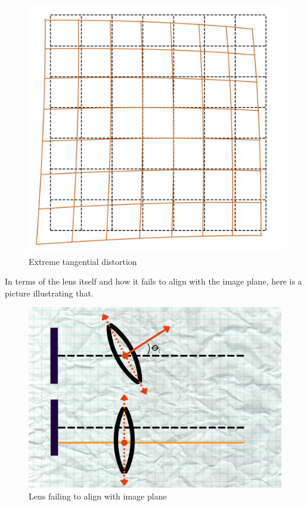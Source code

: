 \documentclass{article}
\begin{document}
\begin{figure}[h]
    \centering
    \includegraphics[scale=0.1]{IMG_1106.jpeg}
    \caption{Extreme tangential distortion}
    \label{fig:enter-label}
\end{figure}

In terms of the lens itself and how it fails to align with the image plane, here is a picture illustrating that. 

\begin{figure}
    \centering
    \includegraphics[scale=0.2]{Images/IMG_1138.png}
    \caption{Lens failing to align with image plane}
    \label{aael}
\end{figure}
\end{document}
